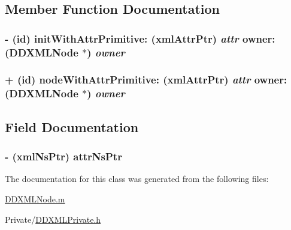 \subsection{Member Function Documentation}
\hypertarget{class_d_d_x_m_l_attribute_node_abbfeb4c4026327d6555de5a0be04e507}{
\subsubsection[{initWithAttrPrimitive:owner:}]{\setlength{\rightskip}{0pt plus 5cm}-\/ (id) initWithAttrPrimitive: (xmlAttrPtr) {\em attr}\/ owner: ({\bf DDXMLNode} $\ast$) {\em owner}}}
\label{class_d_d_x_m_l_attribute_node_abbfeb4c4026327d6555de5a0be04e507}
\hypertarget{class_d_d_x_m_l_attribute_node_afab315d722d56fa724459e4e5fde71e4}{
\subsubsection[{nodeWithAttrPrimitive:owner:}]{\setlength{\rightskip}{0pt plus 5cm}+ (id) nodeWithAttrPrimitive: (xmlAttrPtr) {\em attr}\/ owner: ({\bf DDXMLNode} $\ast$) {\em owner}}}
\label{class_d_d_x_m_l_attribute_node_afab315d722d56fa724459e4e5fde71e4}


\subsection{Field Documentation}
\hypertarget{class_d_d_x_m_l_attribute_node_a3b2110eaeefe644574732a1f9ebbf647}{
\subsubsection[{attrNsPtr}]{\setlength{\rightskip}{0pt plus 5cm}-\/ (xmlNsPtr) {\bf attrNsPtr}}}
\label{class_d_d_x_m_l_attribute_node_a3b2110eaeefe644574732a1f9ebbf647}


The documentation for this class was generated from the following files:\begin{DoxyCompactItemize}
\item 
\hyperlink{_d_d_x_m_l_node_8m}{DDXMLNode.m}\item 
Private/\hyperlink{_d_d_x_m_l_private_8h}{DDXMLPrivate.h}\end{DoxyCompactItemize}
